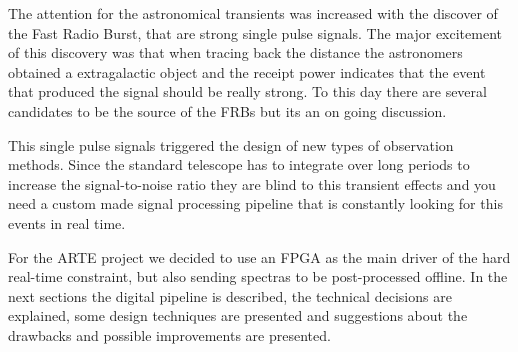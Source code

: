 







The attention for the astronomical transients was increased with the discover of the Fast Radio Burst, that are strong single pulse signals. The major excitement of this discovery was that when tracing back the distance the astronomers obtained a extragalactic object and the receipt power indicates that the event that produced the signal should be really strong. To this day there are several candidates to be the source of the FRBs but its an on going discussion.

This single pulse signals triggered the design of new types of observation methods. Since the standard telescope has to integrate over long periods to increase the signal-to-noise ratio they are blind to this transient effects and you need a custom made signal processing pipeline that is constantly looking for this events in real time. 


For the ARTE project we decided to use an FPGA as the main driver of the hard real-time constraint, but also sending spectras to be post-processed offline. In the next sections the digital pipeline is described, the technical decisions are explained, some design techniques are presented and suggestions about the drawbacks and possible improvements are presented.


